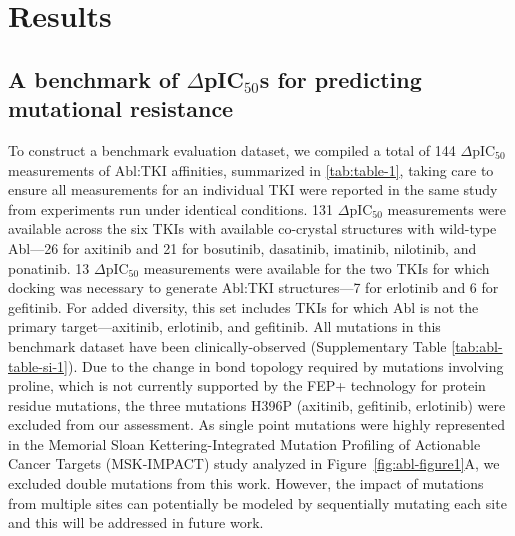 \documentclass[phd,tocprelim]{cornell}
\renewcommand{\TABLE}[1]{\autoref{tab:#1}}
\begin{document}
\section{Results}
\subsection{A benchmark of $\Delta$pIC$_{50}$s for predicting mutational resistance} 
To construct a benchmark evaluation dataset, we compiled a total of 144  $\Delta$pIC$_{50}$ measurements of Abl:TKI affinities, summarized in \TABLE{table-1}, taking care to ensure all measurements for an individual TKI were reported in the same study from experiments run under identical conditions.
131 $\Delta$pIC$_{50}$ measurements were available across the six TKIs with available co-crystal structures with wild-type Abl---26 for axitinib and 21 for bosutinib, dasatinib, imatinib, nilotinib, and ponatinib.
13 $\Delta$pIC$_{50}$ measurements were available for the two TKIs for which docking was necessary to generate Abl:TKI structures---7 for erlotinib and 6 for gefitinib. 
For added diversity, this set includes TKIs for which Abl is not the primary target---axitinib, erlotinib, and gefitinib.
All mutations in this benchmark dataset have been clinically-observed (Supplementary Table \ref{tab:abl-table-si-1}). Due to the change in bond topology required by mutations involving proline, which is not currently supported by the FEP+ technology for protein residue mutations, the three mutations H396P (axitinib, gefitinib, erlotinib) were excluded from our assessment. As single point mutations were highly represented in the Memorial Sloan
Kettering-Integrated Mutation Profiling of Actionable Cancer Targets (MSK-IMPACT) study analyzed in Figure~\ref{fig:abl-figure1}A, we excluded double mutations from this work. However, the impact of mutations from multiple sites can potentially be modeled by sequentially mutating each site and this will be addressed in future work.
\end{document}
